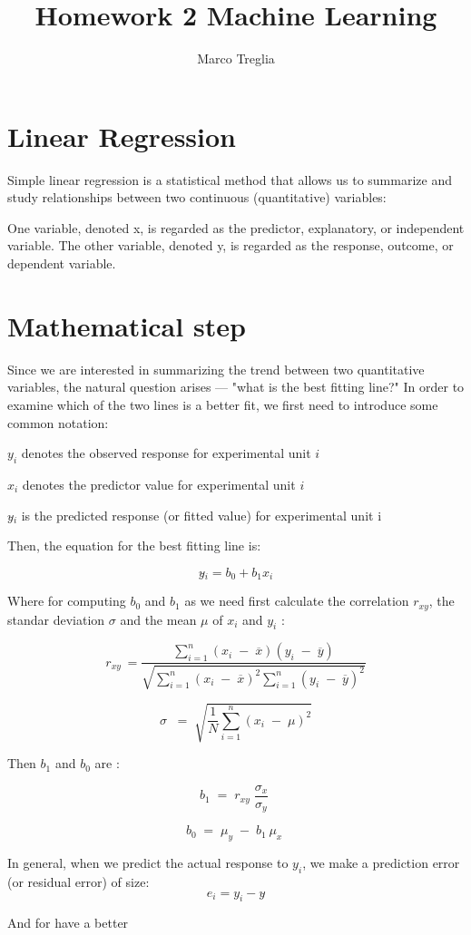\documentclass[11pt]{article}
\theoremstyle{plain}
\theoremstyle{definition}
\begin{document}
 


\title{Homework 2 Machine Learning}
\author{Marco Treglia}
\maketitle

\section{Linear Regression}
Simple linear regression is a statistical method that allows us to summarize and study relationships between two continuous (quantitative) variables:

One variable, denoted x, is regarded as the predictor, explanatory, or independent variable.
The other variable, denoted y, is regarded as the response, outcome, or dependent variable.


\section{Mathematical step}
Since we are interested in summarizing the trend between two quantitative variables, the natural question arises — "what is the best fitting line?"
In order to examine which of the two lines is a better fit, we first need to introduce some common notation:


$y_{i}$  denotes the observed response for experimental unit $i$

$x_{i}$  denotes the predictor value for experimental unit $i$

$y\hat{}_{i}$  is the predicted response (or fitted value) for experimental unit i


Then, the equation for the best fitting line is:

$$y\hat{}_{i} =b_{0}+b_{1} x_{i}  $$


Where for computing $b_{0} $ and  $b_{1} $ as we need first calculate the correlation $r_{xy}$, the standar deviation $\sigma$ and the mean $\mu$ of  $x_{i} $ and $y_{i}$ :


$$ r_{xy\; }=\frac{\sum_{i=1}^{n}{\left( x_{i}\; -\; \overline{x} \right)\left( y_{i}\; -\; \overline{y} \right)}}{\sqrt{\sum_{i=1}^{n}{\left( x_{i}\; -\; \overline{x} \right)^{2}\sum_{i=1}^{n}{\left( y_{i}\; -\; \overline{y} \right)^{2}}}}}$$

$$\sigma \; \; =\; \sqrt{\frac{1}{N}\sum_{i=1}^{n}{\left( x_{i}\; -\; \mu  \right)^{2}}}$$

Then $b_{1} $ and  $b_{0} $ are : 

$$ b_{1}\; =\; r_{xy}\; \frac{\sigma _{x}}{\sigma _{y}}\;  $$

$$ b_{0}\; =\; \mu _{y}\; -\; b_{1\; }\mu _{x}\; $$


In general, when we predict the actual response to $y_{i}$, we make a prediction error (or residual error) of size:
$$  e_{i} = y_{i} - y\hat{} $$

And for have a better 

\subsection{}
\end{document}
